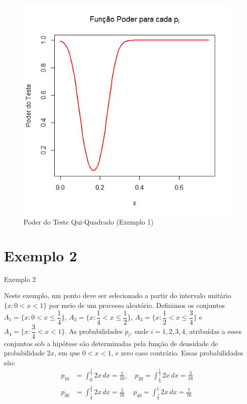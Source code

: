 \documentclass[12pt]{beamer}
\begin{document}
\begin{frame}{}
\begin{block}{}
\begin{figure}
    \centering
    \includegraphics[scale=0.5]{figs/EX1Poder.png}
    \caption{Poder do Teste Qui-Quadrado (Exemplo 1)}
    \label{fig:enter-label}
\end{figure}
\end{block}
\end{frame}

\section{Exemplo 2}
\begin{frame}{Exemplo 2}
\begin{block}{}
\justifying
Neste exemplo, um ponto deve ser selecionado a partir do intervalo unitário $\{x : 0 < x < 1\}$ por meio de um processo aleatório. Definimos os conjuntos $A_1 = \{x : 0 < x \leq \dfrac{1}{4}\}$, $A_2 = \{x : \dfrac{1}{4} < x \leq \dfrac{1}{2}\}$, $A_3 = \{x : \dfrac{1}{2} < x \leq \dfrac{3}{4}\}$ e $A_4 = \{x : \dfrac{3}{4} < x < 1\}$. As probabilidades $p_i$, onde $i = 1, 2, 3, 4$, atribuídas a esses conjuntos sob a hipótese são determinadas pela função de densidade de probabilidade $2x$, em que $0 < x < 1$, e zero caso contrário. Essas probabilidades são:
\begin{align*}
    p_{10} &= \int_{0}^{\frac{1}{4}} 2x \, dx = \frac{1}{16},\quad p_{20} = \int_{\frac{1}{4}}^{\frac{1}{2}} 2x \, dx = \frac{3}{16}\\
    p_{30} &= \int_{\frac{1}{2}}^{\frac{3}{4}} 2x \, dx = \frac{5}{16}\quad~
    p_{40} = \int_{\frac{3}{4}}^{1} 2x \, dx = \frac{7}{16}
\end{align*}

\end{block}
\end{frame}
\end{document}
